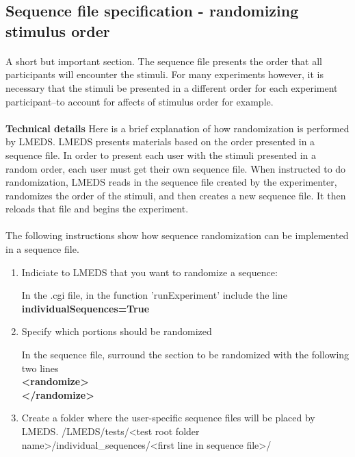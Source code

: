 \subsection{Sequence file specification - randomizing stimulus order}
\label{sec:sequenceSpecRandom}

\paragraph{}
A short but important section.  The sequence file presents the order that all participants will encounter the stimuli.  For many experiments however, it is necessary that the stimuli be presented in a different order for each experiment participant--to account for affects of stimulus order for example. 

\paragraph{}
\textbf{Technical details} Here is a brief explanation of how randomization is performed by LMEDS.  LMEDS presents materials based on the order presented in a sequence file.  In order to present each user with the stimuli presented in a random order, each user must get their own sequence file.  When instructed to do randomization, LMEDS reads in the sequence file created by the experimenter, randomizes the order of the stimuli, and then creates a new sequence file.  It then reloads that file and begins the experiment.

\paragraph{}
The following instructions show how sequence randomization can be implemented in a sequence file.

\begin{enumerate}
\item Indiciate to LMEDS that you want to randomize a sequence:

In the .cgi file, in the function 'runExperiment' include the line \textbf{individualSequences=True}

\item Specify which portions should be randomized

In the sequence file, surround the section to be randomized with the following two lines\\
	\textbf{<randomize>} \\
	\textbf{</randomize>}

\item Create a folder where the user-specific sequence files will be placed by LMEDS.
/LMEDS/tests/<test root folder name>/individual\_sequences/<first line in sequence file>/
\end{enumerate}

